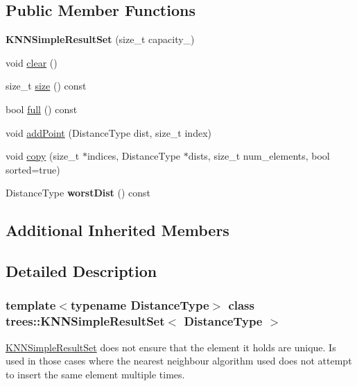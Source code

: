 \subsection*{Public Member Functions}
\begin{DoxyCompactItemize}
\item 
\mbox{\label{classtrees_1_1_k_n_n_simple_result_set_a9b916bba9fe864e42c49a0f402816bd8}} 
{\bfseries K\+N\+N\+Simple\+Result\+Set} (size\+\_\+t capacity\+\_\+)
\item 
void \hyperlink{classtrees_1_1_k_n_n_simple_result_set_a123d8cf8956641841e3b73904414e0b4}{clear} ()
\item 
size\+\_\+t \hyperlink{classtrees_1_1_k_n_n_simple_result_set_a293139927910543164fa430ffdf91311}{size} () const
\item 
bool \hyperlink{classtrees_1_1_k_n_n_simple_result_set_aeaca2d3f888e3abcc4ab4ac5c6eef5d5}{full} () const
\item 
void \hyperlink{classtrees_1_1_k_n_n_simple_result_set_a834254eb4a4e1f4e0046376f9d60719d}{add\+Point} (Distance\+Type dist, size\+\_\+t index)
\item 
void \hyperlink{classtrees_1_1_k_n_n_simple_result_set_aa5ec1079a076f4f989b1af74f11b82fe}{copy} (size\+\_\+t $\ast$indices, Distance\+Type $\ast$dists, size\+\_\+t num\+\_\+elements, bool sorted=true)
\item 
\mbox{\label{classtrees_1_1_k_n_n_simple_result_set_a1e1d527fd572a551f8d09d09f81618bf}} 
Distance\+Type {\bfseries worst\+Dist} () const
\end{DoxyCompactItemize}
\subsection*{Additional Inherited Members}


\subsection{Detailed Description}
\subsubsection*{template$<$typename Distance\+Type$>$\newline
class trees\+::\+K\+N\+N\+Simple\+Result\+Set$<$ Distance\+Type $>$}

\hyperlink{classtrees_1_1_k_n_n_simple_result_set}{K\+N\+N\+Simple\+Result\+Set} does not ensure that the element it holds are unique. Is used in those cases where the nearest neighbour algorithm used does not attempt to insert the same element multiple times. 

